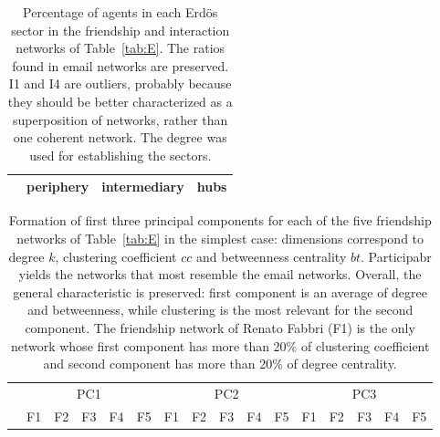 \documentclass[%
 aip,
 jmp,%
 amsmath,amssymb,
 reprint,%
 floatfix,
]{revtex4-1}
\begin{document}
\begin{table}[!h]
	\caption{
	Percentage of agents in each Erd\"os sector in the friendship and interaction networks of Table~\ref{tab:E}. The ratios found in email networks are preserved. I1 and I4 are outliers, probably because they should be better characterized as a superposition of networks, rather than one coherent network. The degree was used for establishing the sectors.
	}
\begin{center}
\begin{tabular}{| l || c | c | c |}\hline
	 & periphery & intermediary & hubs \\ \hline
	
\hline
\end{tabular}
\end{center}
\label{tab:secE}
\end{table}


\begin{table}[!h]
	\caption{Formation of first three principal components for each of the five friendship networks of Table~\ref{tab:E} in the simplest case: dimensions correspond to degree $k$, clustering coefficient $cc$ and betweenness centrality $bt$. Participabr yields the networks that most resemble the email networks.
		Overall, the general characteristic is preserved: first component is an average of degree and betweenness, while clustering is the most relevant for the second component. The friendship network of Renato Fabbri (F1) is the only network whose first component has more than 20\% of clustering coefficient and second component has more than 20\% of degree centrality.}
	\footnotesize
\begin{center}
\begin{tabular}{| l ||  c |c |c |c |c || c | c | c | c | c || c |c |c |c |c |	}\cline{2-16}
\multicolumn{1}{c|}{} & \multicolumn{5}{c||}{PC1}          & \multicolumn{5}{c||}{PC2} & \multicolumn{5}{c|}{PC3}  \\\cline{2-16}
	\multicolumn{1}{c|}{} & 
	F1 & F2 & F3 & F4 & F5 &	
	F1 & F2 & F3 & F4 & F5 &	
	F1 & F2 & F3 & F4 & F5 	\\\hline
	
\hline
\end{tabular}
\end{center}
\label{tab:pcaE1F}
\end{table}
\end{document}
